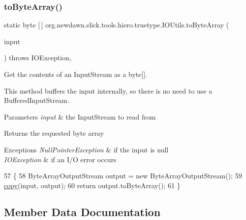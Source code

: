 \subsubsection{\texorpdfstring{to\+Byte\+Array()}{toByteArray()}}
{\footnotesize\ttfamily static byte \mbox{[}$\,$\mbox{]} org.\+newdawn.\+slick.\+tools.\+hiero.\+truetype.\+I\+O\+Utils.\+to\+Byte\+Array (\begin{DoxyParamCaption}\item[{Input\+Stream}]{input }\end{DoxyParamCaption}) throws I\+O\+Exception\hspace{0.3cm}{\ttfamily [inline]}, {\ttfamily [static]}}

Get the contents of an {\ttfamily Input\+Stream} as a {\ttfamily byte\mbox{[}\mbox{]}}. 

This method buffers the input internally, so there is no need to use a {\ttfamily Buffered\+Input\+Stream}.


\begin{DoxyParams}{Parameters}
{\em input} & the {\ttfamily Input\+Stream} to read from \\
\hline
\end{DoxyParams}
\begin{DoxyReturn}{Returns}
the requested byte array 
\end{DoxyReturn}

\begin{DoxyExceptions}{Exceptions}
{\em Null\+Pointer\+Exception} & if the input is null \\
\hline
{\em I\+O\+Exception} & if an I/O error occurs \\
\hline
\end{DoxyExceptions}

\begin{DoxyCode}
57                                                                            \{
58         ByteArrayOutputStream output = \textcolor{keyword}{new} ByteArrayOutputStream();
59         \mbox{\hyperlink{classorg_1_1newdawn_1_1slick_1_1tools_1_1hiero_1_1truetype_1_1_i_o_utils_a8d18ffd2be08d137d80f3f1949ea67e3}{copy}}(input, output);
60         \textcolor{keywordflow}{return} output.toByteArray();
61     \}
\end{DoxyCode}


\subsection{Member Data Documentation}
\mbox{\label{classorg_1_1newdawn_1_1slick_1_1tools_1_1hiero_1_1truetype_1_1_i_o_utils_a7d591bed6c62c8cbf595d86223ffe25f}} 
